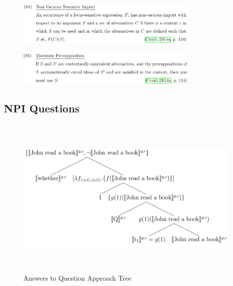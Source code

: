 \begin{frame}[t]
    \subsectionpage\vskip 9pt\vfill
\begin{figure}
    \centering
    \includegraphics[width=0.8\textwidth]{graphics/crnic-semanticimport.png}
\end{figure}\vfill
\end{frame}

\begin{frame}[t]
    \subsectionpage\vskip 9pt\vfill
\begin{figure}
    \centering
    \includegraphics[width=0.8\textwidth]{graphics/crnic-maximisepresupposition.png}
\end{figure}\vfill
\end{frame}

\subsection{NPI Questions}
\begin{frame}[t]
    \subsectionpage\vskip 9pt\vfill
\begin{figure}
    \centering
    \includegraphics[height=8cm]{graphics/questions-guerzoni2003.png}
    \caption{Answers to Question Approach Tree}
\end{figure}\vfill
\end{frame}

